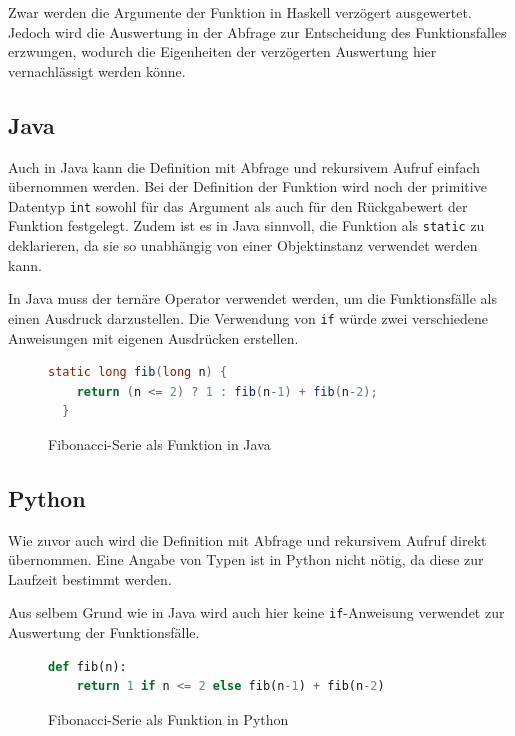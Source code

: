 \documentclass[11pt, parskip=half]{scrartcl}       %
\begin{document}
Zwar werden die Argumente der Funktion in Haskell verzögert ausgewertet.
Jedoch wird die Auswertung in der Abfrage zur Entscheidung des Funktionsfalles erzwungen, wodurch die Eigenheiten der verzögerten Auswertung hier vernachlässigt werden könne.


\subsection{Java}

Auch in Java kann die Definition mit Abfrage und rekursivem Aufruf einfach übernommen werden.
Bei der Definition der Funktion wird noch der primitive Datentyp \texttt{int} sowohl für das Argument als auch für den Rückgabewert der Funktion festgelegt.
Zudem ist es in Java sinnvoll, die Funktion als \texttt{static} zu deklarieren, da sie so unabhängig von einer Objektinstanz verwendet werden kann.

In Java muss der ternäre Operator verwendet werden, um die Funktionsfälle als einen Ausdruck darzustellen.
Die Verwendung von \texttt{if} würde zwei verschiedene Anweisungen mit eigenen Ausdrücken erstellen.

\begin{figure}[h]
  \centering
\begin{lstlisting}[language=java]
  static long fib(long n) {
    return (n <= 2) ? 1 : fib(n-1) + fib(n-2);
  }
\end{lstlisting}  
  \caption{Fibonacci-Serie als Funktion in Java}
  \label{fig:code-java}
\end{figure}


\subsection{Python}

Wie zuvor auch wird die Definition mit Abfrage und rekursivem Aufruf direkt übernommen.
Eine Angabe von Typen ist in Python nicht nötig, da diese zur Laufzeit bestimmt werden.

Aus selbem Grund wie in Java wird auch hier keine \texttt{if}-Anweisung verwendet zur Auswertung der Funktionsfälle.

\begin{figure}[h]
  \centering
\begin{lstlisting}[language=python]
  def fib(n):
	return 1 if n <= 2 else fib(n-1) + fib(n-2)
\end{lstlisting}  
  \caption{Fibonacci-Serie als Funktion in Python}
  \label{fig:code-python}
\end{figure}
\end{document}
